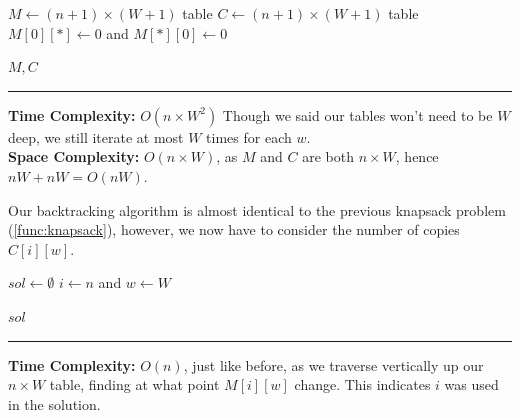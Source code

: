 \begin{Func}

    \vspace{-.5em}
    \begin{algorithm}[H]
        $M \gets (n+1) \times (W+1)$ table 
        $C \gets (n+1) \times (W+1)$ table 
        $M[0][*] \gets 0$ and $M[*][0] \gets 0$\;
        
        \Return $M, C$\;
    \end{algorithm}
    
    \noindent
    \rule{\textwidth}{0.4pt}
    \textbf{Time Complexity:} $O(n \times W^2)$ Though we said our tables won't need to be $W$ deep, we still iterate at most $W$ times for each $w$.\\
    \textbf{Space Complexity:} $O(n \times W)$, as $M$ and $C$ are both $n \times W$, hence $nW+nW=O(nW)$.
\end{Func}

\newpage
\noindent
Our backtracking algorithm is almost identical to the previous knapsack problem (\ref{func:knapsack}), however, we now have to consider the number of copies $C[i][w]$.
\begin{Func}

    \vspace{-.5em}
    \begin{algorithm}[H]
        $sol \gets \emptyset$\;
        $i \gets n$ and $w \gets W$\;
        
        
        \Return $sol$\;
    \end{algorithm}
    
    \noindent
    \rule{\textwidth}{0.4pt}
    \textbf{Time Complexity:} $O(n)$, just like before, as we traverse vertically up our $n\times W$ table, finding at what point $M[i][w]$ change. 
    This indicates $i$ was used in the solution.
\end{Func}

